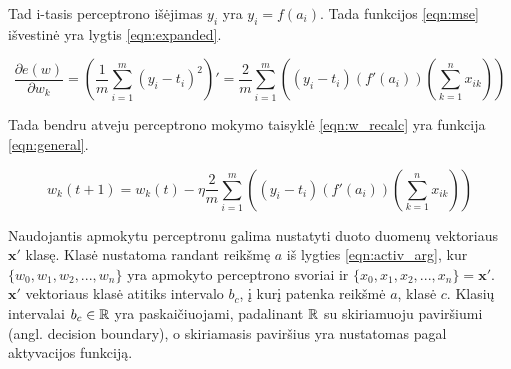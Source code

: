 Tad i-tasis perceptrono išėjimas $y_i$ yra $y_i = f(a_i)$. Tada funkcijos \ref{eqn:mse} išvestinė yra lygtis \ref{eqn:expanded}.

\begin{equation}
	\label{eqn:expanded}
	\dfrac{\partial e(w)}{\partial w_k} = (\dfrac{1}{m}\sum_{i=1}^{m} (y_i - t_i)^2)'
		= \dfrac{2}{m}\sum_{i=1}^{m}
			((y_i - t_i)(f'(a_i))(\sum_{k = 1}^{n} x_{ik}))
\end{equation}

Tada bendru atveju perceptrono mokymo taisyklė \ref{eqn:w_recalc} yra funkcija \ref{eqn:general}.

\begin{equation}
	\label{eqn:general}
	w_k(t + 1) = w_k(t) - \eta \dfrac{2}{m}\sum_{i=1}^{m} ((y_i - t_i)(f'(a_i))(\sum_{k = 1}^{n} x_{ik}))
\end{equation}

Naudojantis apmokytu perceptronu galima nustatyti duoto duomenų vektoriaus $\boldsymbol{x}'$ klasę. Klasė nustatoma randant reikšmę $a$ iš lygties \ref{eqn:activ_arg}, kur $\{w_{0}, w_{1}, w_{2}, ..., w_{n}\}$ yra apmokyto perceptrono svoriai ir $\{x_{0}, x_{1}, x_{2}, ..., x_{n}\} = \boldsymbol{x}'$. $\boldsymbol{x}'$ vektoriaus klasė atitiks intervalo $b_c$, į kurį patenka reikšmė $a$, klasė $c$. Klasių intervalai $b_c \in \mathbb{R}$ yra paskaičiuojami, padalinant $\mathbb{R}$ su skiriamuoju paviršiumi (angl. decision boundary), o skiriamasis paviršius yra nustatomas pagal aktyvacijos funkciją.
